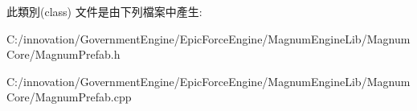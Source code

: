 此類別(class) 文件是由下列檔案中產生\+:\begin{DoxyCompactItemize}
\item 
C\+:/innovation/\+Government\+Engine/\+Epic\+Force\+Engine/\+Magnum\+Engine\+Lib/\+Magnum\+Core/Magnum\+Prefab.\+h\item 
C\+:/innovation/\+Government\+Engine/\+Epic\+Force\+Engine/\+Magnum\+Engine\+Lib/\+Magnum\+Core/Magnum\+Prefab.\+cpp\end{DoxyCompactItemize}
